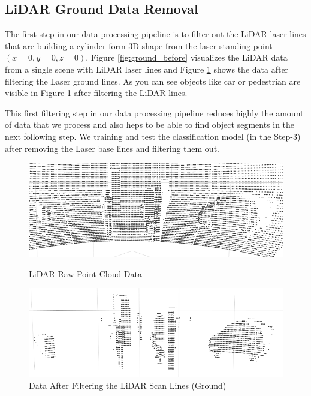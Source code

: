 



\subsection{LiDAR Ground Data Removal}
% 

The first step in our data processing pipeline is to filter out the LiDAR laser lines that are building a cylinder form 3D shape from the laser standing point $(x=0, y=0, z=0)$. Figure \ref{fig:ground_before} visualizes the LiDAR data from a single scene with LiDAR laser lines and Figure \ref{fig:after} shows the data after filtering the Laser ground lines. As you can see objects like car or pedestrian are visible in Figure \ref{fig:after} after filtering the LiDAR lines.

This first filtering step in our data processing pipeline reduces highly the amount of data that we process and also heps to be able to find object segments in the next following step. 
We training and test the classification model (in the Step-3) after removing the Laser base lines and filtering them out.  


\begin{figure}
\centering
\begin{minipage}{0.49\textwidth}
  \centering
        \includegraphics[width=.9\linewidth]{images/ground_before2.png}
        \caption{LiDAR Raw Point Cloud Data}
        \label{fig:ground_before}
\end{minipage}%
\begin{minipage}{0.49\textwidth}
  \centering
        \includegraphics[width=.9\linewidth]{images/ground_after2.png}
        \caption{Data After Filtering the LiDAR Scan Lines (Ground)}
        \label{fig:after}
\end{minipage}%
\end{figure}


